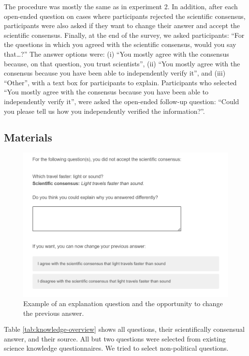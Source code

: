 \documentclass[
  doc,floatsintext]{apa6}
\begin{document}
The procedure was mostly the same as in experiment 2. In addition, after each open-ended question on cases where participants rejected the scientific consensus, participants were also asked if they want to change their answer and accept the scientific consensus. Finally, at the end of the survey, we asked participants: ``For the questions in which you agreed with the scientific consensus, would you say that\ldots?'' The answer options were: (i) ``You mostly agree with the consensus because, on that question, you trust scientists'', (ii) ``You mostly agree with the consensus because you have been able to independently verify it'', and (iii) ``Other'', with a text box for participants to explain. Participants who selected ``You mostly agree with the consensus because you have been able to independently verify it'', were asked the open-ended follow-up question: ``Could you please tell us how you independently verified the information?''.

\subsection{Materials}\label{materials-3}

\FloatBarrier



\begin{figure}

{\centering \includegraphics[width=0.5\linewidth]{figures/study3_example_explanation} 

}

\caption{Example of an explanation question and the opportunity to change the previous answer.}\label{fig:exp3-explanation-example}
\end{figure}

Table \ref{tab:knowledge-overview} shows all questions, their scientifically consensual answer, and their source. All but two questions were selected from existing science knowledge questionnaires. We tried to select non-political questions.

\begingroup\fontsize{8}{10}\selectfont
\end{document}
